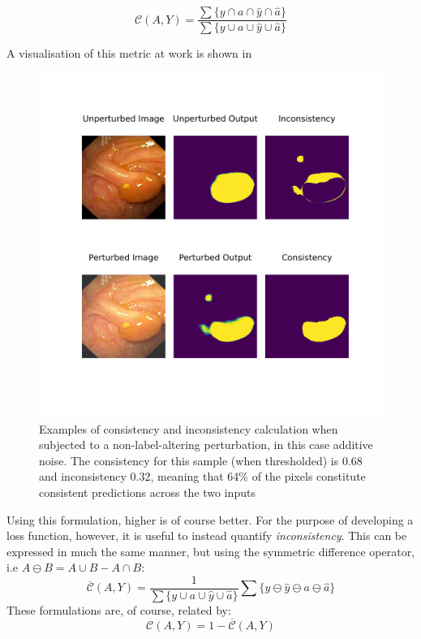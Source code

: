 \begin{equation}
    \mathcal{C}(A,Y) = \frac{\sum\{y \cap a \cap \hat{y} \cap \hat{a} \}}
    {\sum\{ y \cup a \cup \hat{y} \cup \hat{a} \}}
\end{equation}

A visualisation of this metric at work is shown in 

\begin{figure}[h!]
    \centering
    \includegraphics[width=\linewidth]{illustrations/consistency_examples.png}
    \caption[Segmentation Consistency Visualization 1]{Examples of consistency and inconsistency calculation when subjected to a non-label-altering perturbation, in this case additive noise. The consistency for this sample (when thresholded) is 0.68 and inconsistency 0.32, meaning that 64\% of the pixels constitute consistent predictions across the two inputs}
    \label{fig:consistency_example}
\end{figure}

Using this formulation, higher is of course better. For the purpose of developing a loss function, however, it is useful to instead quantify \textit{inconsistency}. This can be expressed in much the same manner, but using the symmetric difference operator, i.e \(A \ominus B = A \cup B - A \cap B\): 
\begin{equation}\label{eq:inconsistency}
    \overline{\mathcal{C}}(A,Y) = \frac{1}{\sum\{y \cup a \cup \hat{y} \cup \hat{a} \}} \sum \{y\ominus\hat{y}\ominus a\ominus\hat{a}\}
\end{equation}
These formulations are, of course, related by:
\begin{equation*}
    \mathcal{C}(A,Y) = 1-\overline{\mathcal{C}}(A,Y)
\end{equation*}


